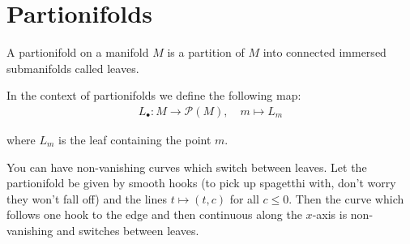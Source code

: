 


	\section{Partionifolds}
		A partionifold on a manifold $M$ is a partition of $M$ into connected immersed submanifolds called leaves. \bigskip

		In the context of partionifolds we define the following map:
%
		\begin{align*}
			L_\bullet : M \to \mathcal{P}(M), \quad m \mapsto L_m
		\end{align*}

		where $L_m$ is the leaf containing the point $m$. \bigskip

		You can have non-vanishing curves which switch between leaves. Let the partionifold be given by smooth hooks (to pick up spagetthi with, don't worry they won't fall off) and the lines $t \mapsto (t, c)$ for all $c \leq 0$. Then the curve which follows one hook to the edge and then continuous along the $x$-axis is non-vanishing and switches between leaves.

